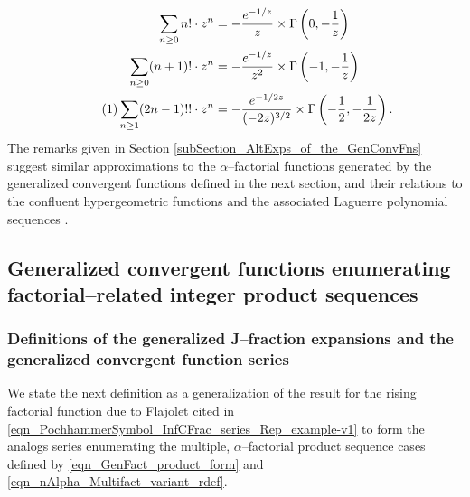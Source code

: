 \documentclass[12pt,reqno]{article}
\numberwithin{sfootnote}{section}
\numberwithin{equation}{section}
\newcommand{\tagonce}[0]{
     \addtocounter{equation}{1}
     \tag{\theequation}
}
\theoremstyle{plain}
\theoremstyle{definition}
\theoremstyle{remark}
\newcommand{\cf}[0]{cf.\ }
\begin{document}
\begin{align*} 
\sum_{n \geq 0} n! \cdot z^{n} & = 
     -\frac{e^{-1/z}}{z} \times 
     \Gamma\left(0, -\frac{1}{z}\right) \\ 
\sum_{n \geq 0} (n+1)! \cdot z^{n} & = 
     -\frac{e^{-1/z}}{z^2} \times 
     \Gamma\left(-1, -\frac{1}{z}\right) \\ 
\tagonce\label{eqn_RelatedFormsOf_SgAndDblFact_OGFs-intro_examples-stmts_v1} 
\sum_{n \geq 1} (2n-1)!! \cdot z^{n} & = 
     -\frac{e^{-1 / 2 z}}{(-2z)^{3/2}} \times 
     \Gamma\left(-\frac{1}{2}, -\frac{1}{2 z}\right). 
\end{align*} 
The remarks given in 
Section \ref{subSection_AltExps_of_the_GenConvFns} 
suggest similar approximations to the 
$\alpha$--factorial functions generated by the 
generalized convergent functions defined in the next section, and their 
relations to the confluent hypergeometric functions and the 
associated Laguerre polynomial sequences 
\citep[\cf \S 18.5(ii)]{NISTHB} \citep[\S 4.3.1]{UC}. 

\subsection{Generalized convergent functions enumerating 
            factorial--related integer product sequences} 
\label{subSection_Intro_GenConvFn_Defs_and_Properties} 

\subsubsection{Definitions of the generalized J--fraction expansions and 
               the generalized convergent function series} 

We state the next definition as a 
generalization of the result for the 
rising factorial function due to Flajolet cited in 
\eqref{eqn_PochhammerSymbol_InfCFrac_series_Rep_example-v1} 
to form the analogs series enumerating the 
multiple, $\alpha$--factorial product 
sequence cases defined by \eqref{eqn_GenFact_product_form} and 
\eqref{eqn_nAlpha_Multifact_variant_rdef}. 
\end{document}
